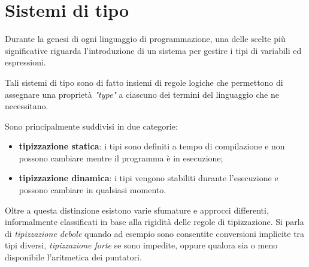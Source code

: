 \section{Sistemi di tipo}
\label{sec:3-1-type-systems}

Durante la genesi di ogni linguaggio di programmazione, una delle scelte più significative riguarda
l'introduzione di un sistema per gestire i tipi di variabili ed espressioni.

\noindent Tali sistemi di tipo sono di fatto insiemi di regole logiche che permettono
di assegnare una proprietà \textit{"type"} a ciascuno dei termini del linguaggio che ne necessitano.

\noindent Sono principalmente suddivisi in due categorie:
\begin{itemize}
      \item \textbf{tipizzazione statica}: i tipi sono definiti a tempo di compilazione
            e non possono cambiare mentre il programma è in esecuzione;
      \item \textbf{tipizzazione dinamica}: i tipi vengono stabiliti durante l'esecuzione
            e possono cambiare in qualsiasi momento.
\end{itemize}

\noindent Oltre a questa distinzione esistono varie sfumature e approcci differenti,
informalmente classificati in base alla rigidità delle regole di tipizzazione.
Si parla di \textit{tipizzazione debole} quando ad esempio sono consentite conversioni implicite tra tipi diversi,
\textit{tipizzazione forte} se sono impedite, oppure qualora sia o meno disponibile l'aritmetica dei puntatori.

\newpage

